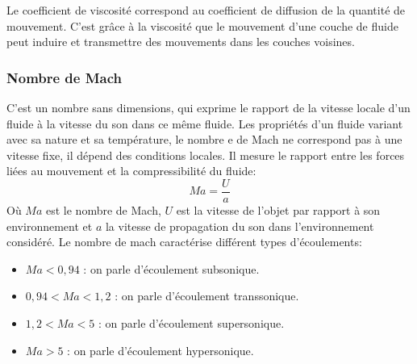 \documentclass[10pt,a4paper]{article}
\begin{document}
Le coefficient de viscosité correspond au coefficient de diffusion de la quantité de mouvement. C'est grâce à la viscosité que le mouvement d'une couche de fluide peut induire et transmettre des mouvements dans les couches voisines.

\subsubsection{Nombre de Mach\cite{nbmach}}
C'est un nombre sans dimensions, qui exprime le rapport de la vitesse locale d'un fluide à la vitesse du son dans ce même fluide. Les propriétés d'un fluide variant avec sa nature et sa température, le nombre e de Mach ne correspond pas à une vitesse fixe, il dépend des conditions locales. Il mesure le rapport entre les forces liées au mouvement et la compressibilité du fluide:
\begin{equation}
Ma = \frac{U}{a}
\end{equation}
Où $Ma$ est le nombre de Mach, $U$ est la vitesse de l'objet par rapport à son environnement et $a$ la vitesse de propagation du son\cite{vitesseson} dans l'environnement considéré. Le nombre de mach caractérise différent types d'écoulements:
\begin{itemize}
\item $Ma < 0,94$ : on parle d'écoulement subsonique.
\item $ 0,94 < Ma < 1,2$ : on parle d'écoulement transsonique.
\item $1,2 < Ma < 5$ : on parle d'écoulement supersonique.
\item $Ma > 5$ : on parle d'écoulement hypersonique.
\end{itemize}
\end{document}
